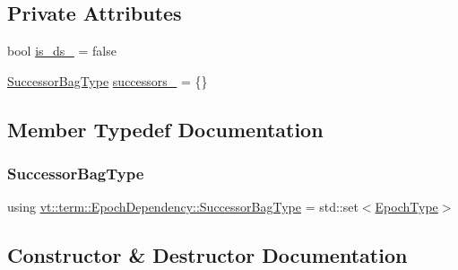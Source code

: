 \subsection*{Private Attributes}
\begin{DoxyCompactItemize}
\item 
bool \hyperlink{structvt_1_1term_1_1_epoch_dependency_af0e5729c264094d1bbc132f429a1219b}{is\+\_\+ds\+\_\+} = false
\item 
\hyperlink{structvt_1_1term_1_1_epoch_dependency_a3f00b47c33158f3241ebbeb0a0cb7b1d}{Successor\+Bag\+Type} \hyperlink{structvt_1_1term_1_1_epoch_dependency_ac9061b05e0c17f67b01754c4c1599770}{successors\+\_\+} = \{\}
\end{DoxyCompactItemize}


\subsection{Member Typedef Documentation}
\mbox{\label{structvt_1_1term_1_1_epoch_dependency_a3f00b47c33158f3241ebbeb0a0cb7b1d}} 
\subsubsection{\texorpdfstring{Successor\+Bag\+Type}{SuccessorBagType}}
{\footnotesize\ttfamily using \hyperlink{structvt_1_1term_1_1_epoch_dependency_a3f00b47c33158f3241ebbeb0a0cb7b1d}{vt\+::term\+::\+Epoch\+Dependency\+::\+Successor\+Bag\+Type} =  std\+::set$<$\hyperlink{namespacevt_a985a5adf291c34a3ca263b3378388236}{Epoch\+Type}$>$}



\subsection{Constructor \& Destructor Documentation}
\mbox{\label{structvt_1_1term_1_1_epoch_dependency_ac02fe388ef8c1b7097a453e0fcef5bbc}} 
